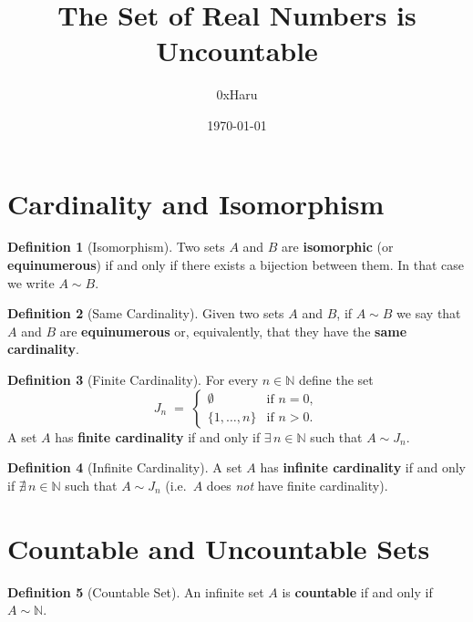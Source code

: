 \documentclass[12pt]{article}
\title{\textbf{The Set of Real Numbers is Uncountable}}
\author{0xHaru}
\date{\today}
\theoremstyle{definition}
\newtheorem{definition}{Definition}[section]
\theoremstyle{plain}
\theoremstyle{remark}
\newcommand{\N}{\mathbb{N}}
\begin{document}
\maketitle

\section{Cardinality and Isomorphism}

\begin{definition}[Isomorphism]
Two sets $A$ and $B$ are \textbf{isomorphic} (or \textbf{equinumerous}) if and only if
there exists a bijection between them. In that case we write $A \sim B$.
\end{definition}

\begin{definition}[Same Cardinality]
Given two sets $A$ and $B$, if $A \sim B$ we say that $A$ and $B$ are
\textbf{equinumerous} or, equivalently, that they have the \textbf{same cardinality}.
\end{definition}

\begin{definition}[Finite Cardinality]
For every $n \in \N$ define the set
\[
    J_n \;=\;
    \begin{cases}
        \emptyset       & \text{if } n = 0,\\
        \{1,\ldots, n\} & \text{if } n > 0.
    \end{cases}
\]
A set $A$ has \textbf{finite cardinality} if and only if $\exists\, n\in\N$ such that
$A \sim J_n$.
\end{definition}

\begin{definition}[Infinite Cardinality]
A set $A$ has \textbf{infinite cardinality} if and only if $\nexists\, n\in\N$ such
that $A \sim J_n$ (i.e.\ $A$ does \emph{not} have finite cardinality).
\end{definition}

\section{Countable and Uncountable Sets}

\begin{definition}[Countable Set]
An infinite set $A$ is \textbf{countable} if and only if $A \sim \N$.
\end{definition}
\end{document}
